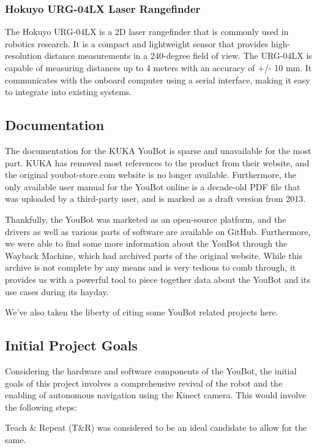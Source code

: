 \documentclass[a4paper, 12pt]{article}
\begin{document}
    \subsubsection{Hokuyo URG-04LX Laser Rangefinder}

    The Hokuyo URG-04LX is a 2D laser rangefinder that is commonly used in robotics research. It is a compact and lightweight sensor that provides high-resolution distance measurements in a 240-degree field of view. The URG-04LX is capable of measuring distances up to 4 meters with an accuracy of +/- 10 mm. It communicates with the onboard computer using a serial interface, making it easy to integrate into existing systems. 

    \subsection{Documentation}

    The documentation for the KUKA YouBot is sparse and unavailable for the most part. KUKA has removed most references to the product from their website, and the original youbot-store.com website is no longer available. Furthermore, the only available user manual for the YouBot online is a decade-old PDF file that was uploaded by a third-party user, and is marked as a draft version from 2013. 

    Thankfully, the YouBot was marketed as an open-source platform, and the drivers as well as various parts of software are available on GitHub. Furthermore, we were able to find some more information about the YouBot through the Wayback Machine, which had archived parts of the original website. While this archive is not complete by any means and is very tedious to comb through, it provides us with a powerful tool to piece together data about the YouBot and its use cases during its hayday.

    We've also taken the liberty of citing some YouBot related projects here.

    \subsection{Initial Project Goals}

    Considering the hardware and software components of the YouBot, the initial goals of this project involves a comprehensive revival of the robot and the enabling of autonomous navigation using the Kinect camera. This would involve the following steps:

    Teach \& Repeat (T\&R) was considered to be an ideal candidate to allow for the same.
\end{document}
